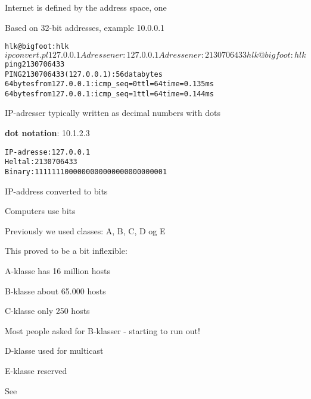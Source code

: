 \documentclass[Screen16to9,17pt]{foils}
\begin{document}
\begin{list1}
\item Internet is defined by the address space, one
\item Based on 32-bit addresses, example 10.0.0.1
\end{list1}


\begin{alltt}
hlk@bigfoot:hlk$ ipconvert.pl 127.0.0.1
Adressen er: 127.0.0.1
Adressen er: 2130706433
hlk@bigfoot:hlk$ ping 2130706433
PING 2130706433 (127.0.0.1): 56 data bytes
64 bytes from 127.0.0.1: icmp_seq=0 ttl=64 time=0.135 ms
64 bytes from 127.0.0.1: icmp_seq=1 ttl=64 time=0.144 ms
\end{alltt}

\begin{list1}
\item IP-adresser typically written as decimal numbers with dots
\item {\bf dot notation}: 10.1.2.3
\end{list1}


\begin{alltt}
IP-adresse: 127.0.0.1
Heltal:	2130706433
Binary:	1111111000000000000000000000001
\end{alltt}

\begin{list1}
\item IP-address converted to bits
\item Computers use bits
\end{list1}


\begin{list1}
\item Previously we used classes: A, B, C, D og E
\item This proved to be a bit inflexible:
\begin{list2}
\item A-klasse has 16 million hosts
\item B-klasse about 65.000 hosts
\item C-klasse only 250 hosts
\end{list2}
\item Most people asked for B-klasser - starting to run out!
\item D-klasse used for multicast
\item E-klasse reserved
\item See 
\end{list1}
\end{document}
